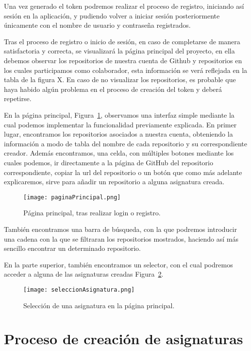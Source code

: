 Una vez generado el token podremos realizar el proceso de registro, iniciando así sesión en la aplicación, y pudiendo volver a iniciar sesión posteriormente únicamente con el nombre de usuario y contraseña registrados.


Tras el proceso de registro o inicio de sesión, en caso de completarse de manera satisfactoria y correcta, se visualizará la página principal del proyecto, en ella debemos observar los repositorios de nuestra cuenta de Github y repositorios en los cuales participamos como colaborador, esta información se verá reflejada en la tabla de la figura X.
En caso de no visualizar los repositorios, es probable que haya habido algún problema en el proceso de creación del token y deberá repetirse.

En la página principal, Figura~\ref{figure:mainPage}, observamos una interfaz simple mediante la cual podemos implementar la funcionalidad previamente explicada. En primer lugar, encontramos los repositorios asociados a nuestra cuenta, obteniendo la información a modo de tabla del nombre de cada repositorio y su correspondiente creador. Además encontramos, una celda, con múltiples botones mediante los cuales podemos, ir directamente a la página de GitHub del repositorio correspondiente, copiar la url del repositorio  o un botón que como más adelante explicaremos, sirve para añadir un repositorio a alguna asignatura creada.

\begin{figure}[h!]
  \texttt{[image: paginaPrincipal.png]}
  \caption{Página principal, tras realizar login o registro.}
  \label{figure:mainPage}
\end{figure}

También encontramos una barra de búsqueda, con la que podremos introducir una cadena con la que se filtraran los repositorios mostrados, haciendo así más sencillo encontrar un determinado repositorio.

En la parte superior, también encontramos un selector, con el cual podremos acceder a alguna de las asignaturas creadas Figura~\ref{figure:mainPageSeleccion}.
\begin{figure}[h!]
  \texttt{[image: seleccionAsignatura.png]}
  \caption{Selección de una asignatura en la página principal.}
  \label{figure:mainPageSeleccion}
\end{figure}


\section{Proceso de creación de asignaturas}

